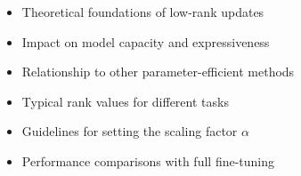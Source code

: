 \begin{itemize}
    \item Theoretical foundations of low-rank updates
    \item Impact on model capacity and expressiveness
    \item Relationship to other parameter-efficient methods
\end{itemize}

\begin{itemize}
    \item Typical rank values for different tasks
    \item Guidelines for setting the scaling factor $\alpha$
    \item Performance comparisons with full fine-tuning
\end{itemize} 